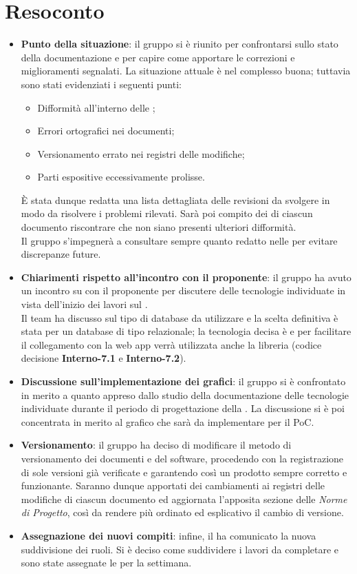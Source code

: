 \section{Resoconto}
\begin{itemize}
\item \textbf{Punto della situazione}: il gruppo si è riunito per confrontarsi sullo stato della documentazione e per capire come apportare le correzioni  e miglioramenti segnalati. La situazione attuale è nel complesso buona; tuttavia sono stati evidenziati i seguenti punti:
	\begin{itemize}
		\item Difformità all'interno delle ;
		\item Errori ortografici nei documenti;
		\item Versionamento errato nei registri delle modifiche;
		\item Parti espositive eccessivamente prolisse.
	\end{itemize} 
È stata dunque redatta una lista dettagliata delle revisioni da svolgere in modo da risolvere i problemi rilevati. Sarà poi compito dei  di ciascun documento riscontrare che non siano presenti ulteriori difformità. \\
Il gruppo s'impegnerà a consultare sempre quanto redatto nelle \NdPv{} per evitare discrepanze future.

\item\textbf{Chiarimenti rispetto all'incontro con il proponente}: il gruppo ha avuto un incontro su  con il proponente per discutere delle tecnologie individuate in vista dell'inizio dei lavori sul \textit{}. \\ Il team ha discusso sul tipo di database da utilizzare e la scelta definitiva è stata per un database di tipo relazionale; la tecnologia decisa è \textit{} e per facilitare il collegamento con la web app verrà utilizzata anche la libreria \textit{} (codice decisione \textbf{Interno-7.1} e \textbf{Interno-7.2}).

\item\textbf{Discussione sull'implementazione dei grafici}: il gruppo si è confrontato in merito a quanto appreso dallo studio della documentazione delle tecnologie individuate durante il periodo di progettazione della . La discussione si è poi concentrata in merito al grafico che sarà da implementare per il PoC.

\item\textbf{Versionamento}: il gruppo ha deciso di modificare il metodo di versionamento dei documenti e del software, procedendo con la registrazione di sole versioni già verificate e garantendo così un prodotto sempre corretto e funzionante. Saranno dunque apportati dei cambiamenti ai registri delle modifiche di ciascun documento ed aggiornata l'apposita sezione delle \textit{Norme di Progetto}, così da rendere più ordinato ed esplicativo il cambio di versione.

\item \textbf{Assegnazione dei nuovi compiti}: infine, il  ha comunicato la nuova suddivisione dei ruoli. Si è deciso come suddividere i lavori da completare e sono state assegnate le  per la settimana.
\end{itemize}

\newpage